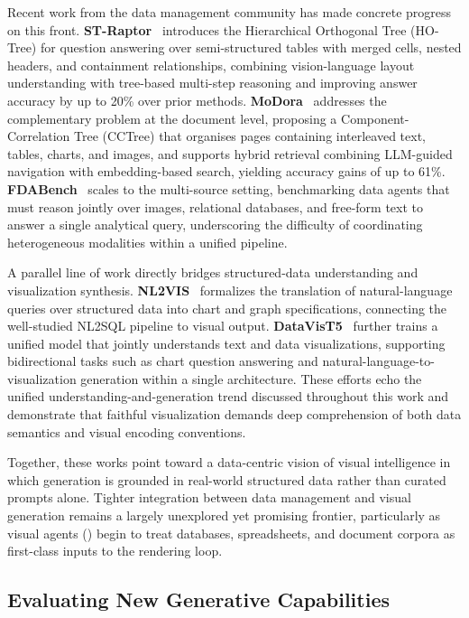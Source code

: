 \documentclass{llmxive}
\begin{document}
Recent work from the data management community has made concrete progress on this front. \textbf{ST-Raptor}~\citep{STRaptor} introduces the Hierarchical Orthogonal Tree (HO-Tree) for question answering over semi-structured tables with merged cells, nested headers, and containment relationships, combining vision-language layout understanding with tree-based multi-step reasoning and improving answer accuracy by up to 20\% over prior methods. \textbf{MoDora}~\citep{MoDora} addresses the complementary problem at the document level, proposing a Component-Correlation Tree (CCTree) that organises pages containing interleaved text, tables, charts, and images, and supports hybrid retrieval combining LLM-guided navigation with embedding-based search, yielding accuracy gains of up to 61\%. \textbf{FDABench}~\citep{FDABench} scales to the multi-source setting, benchmarking data agents that must reason jointly over images, relational databases, and free-form text to answer a single analytical query, underscoring the difficulty of coordinating heterogeneous modalities within a unified pipeline.

A parallel line of work directly bridges structured-data understanding and visualization synthesis. \textbf{NL2VIS}~\citep{NL2VIS} formalizes the translation of natural-language queries over structured data into chart and graph specifications, connecting the well-studied NL2SQL pipeline to visual output. \textbf{DataVisT5}~\citep{DataVisT5} further trains a unified model that jointly understands text and data visualizations, supporting bidirectional tasks such as chart question answering and natural-language-to-visualization generation within a single architecture. These efforts echo the unified understanding-and-generation trend discussed throughout this work and demonstrate that faithful visualization demands deep comprehension of both data semantics and visual encoding conventions.

Together, these works point toward a data-centric vision of visual intelligence in which generation is grounded in real-world structured data rather than curated prompts alone. Tighter integration between data management and visual generation remains a largely unexplored yet promising frontier, particularly as visual agents () begin to treat databases, spreadsheets, and document corpora as first-class inputs to the rendering loop.

\subsection{Evaluating New Generative Capabilities}
\label{subsec:eval_frontier}
\end{document}
